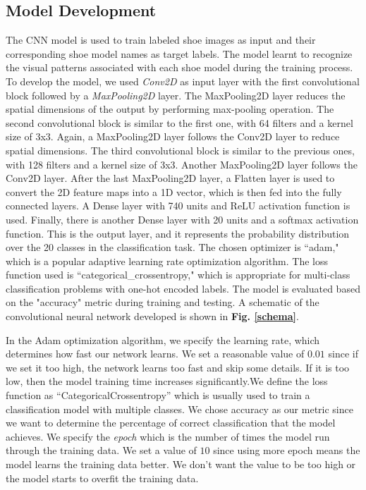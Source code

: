 \documentclass[11pt,a4paper]{article}
\begin{document}
\subsection{Model Development}
The CNN model is used to train labeled shoe images as input and their corresponding shoe model names as target labels. The model learnt to recognize the visual patterns associated with each shoe model during the training process.  To develop the model, we used \emph{Conv2D} as input layer with the first convolutional block followed by a \emph{MaxPooling2D} layer. The MaxPooling2D layer reduces the spatial dimensions of the output by performing max-pooling operation. The second convolutional block is similar to the first one, with 64 filters and a kernel size of 3x3. Again, a MaxPooling2D layer follows the Conv2D layer to reduce spatial dimensions. The third convolutional block is similar to the previous ones, with 128 filters and a kernel size of 3x3. Another MaxPooling2D layer follows the Conv2D layer. After the last MaxPooling2D layer, a Flatten layer is used to convert the 2D feature maps into a 1D vector, which is then fed into the fully connected layers. A Dense layer with 740 units and ReLU activation function is used. Finally, there is another Dense layer with 20 units and a softmax activation function. This is the output layer, and it represents the probability distribution over the 20 classes in the classification task. The chosen optimizer is ``adam," which is a popular adaptive learning rate optimization algorithm. The loss function used is ``categorical\_crossentropy," which is appropriate for multi-class classification problems with one-hot encoded labels. The model is evaluated based on the "accuracy" metric during training and testing. A schematic of the convolutional neural network developed is shown in \textbf{Fig. \ref{schema}}.


In the Adam optimization algorithm, we specify the learning rate, which determines how fast our network learns. We set a reasonable value of $0.01$ since if we set it too high, the network learns too fast and skip some details. If it is too low, then the model training time increases significantly.We define the loss function as ``CategoricalCrossentropy'' which is usually used to train a classification model with multiple classes. We chose accuracy as our metric since we want to determine the percentage of correct classification that the model achieves. We specify the \emph{epoch} which is the number of times the model run through the training data. We set a value of $10$ since using more epoch means the model learns the training data better. We don't want the value to be too high or the model starts to overfit the training data. 
\end{document}
